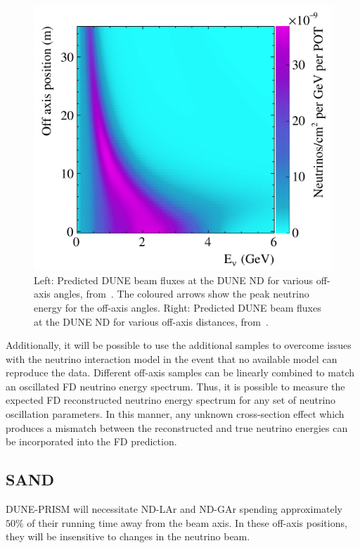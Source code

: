 \begin{figure}[h]
\begin{minipage}[t]{0.49\textwidth}
    \includegraphics[width=\linewidth]{files/figures/dune_detector/offAxisFlux2d}
  \end{minipage}
  \caption[Beam \numu fluxes at different off-axis distances and angles at the DUNE ND]{Left: Predicted DUNE beam \numu fluxes at the DUNE ND for various off-axis angles, from~\cite{ndCdr}. The coloured arrows show the peak neutrino energy for the off-axis angles. Right: Predicted DUNE beam \numu fluxes at the DUNE ND for various off-axis distances, from~\cite{ndCdr}.}
  \label{fig:offAxisFluxes}
\end{figure}

Additionally, it will be possible to use the additional samples to overcome issues with the neutrino interaction model in the event that no available model can reproduce the data.
Different off-axis samples can be linearly combined to match an oscillated FD neutrino energy spectrum.
Thus, it is possible to measure the expected FD reconstructed neutrino energy spectrum for any set of neutrino oscillation parameters.
In this manner, any unknown cross-section effect which produces a mismatch between the reconstructed and true neutrino energies can be incorporated into the FD prediction.

\subsection{SAND}
\label{sec:dune:nd:sand}

DUNE-PRISM will necessitate ND-LAr and ND-GAr spending approximately $50\%$ of their running time away from the beam axis.
In these off-axis positions, they will be insensitive to changes in the neutrino beam.

